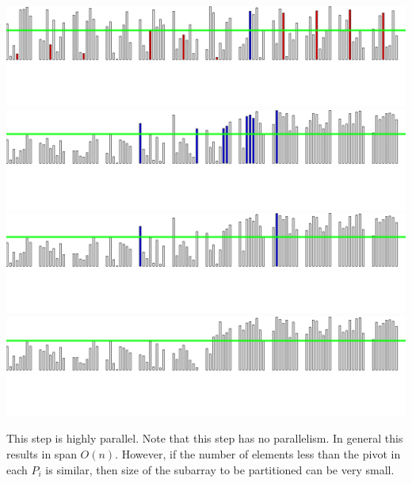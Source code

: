 \documentclass[xcolor=x11names, svgnames, rgb]{beamer}
\begin{document}
\begin{frame}[t]{}
\begin{overprint}
	\includegraphics[width=\linewidth]{imgs/stridedAlgSim/stridedAlgSim_35.png}
	\onslide<5>\includegraphics[width=\linewidth]{imgs/stridedAlgSim/stridedAlgSim_4.png}
	\onslide<6>\includegraphics[width=\linewidth]{imgs/stridedAlgSim/stridedAlgSim_45.png}
	\onslide<7>\includegraphics[width=\linewidth]{imgs/stridedAlgSim/stridedAlgSim_5.png}
	\end{overprint}
	\vspace{0.25cm}
	\begin{overprint}
	This step is highly parallel.
	\onslide<7> Note that this step has no parallelism. In general this results in span $O(n)$. However, if the number of elements less than the pivot in each $P_i$ is similar, then size of the subarray to be partitioned can be very small.
	\end{overprint}
\end{frame}
\end{document}
